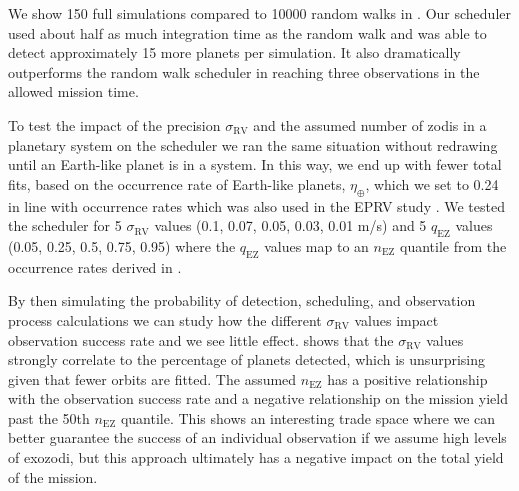 We show 150 full simulations compared to 10000 random walks in 
. Our scheduler used about half as much integration
time as the random walk and was able to detect approximately 15 more planets
per simulation. It also dramatically outperforms the random walk scheduler
in reaching three observations in the allowed mission time.

To test the impact of the precision $\sigma_\textrm{RV}$ and the assumed number of zodis in
a planetary system on the scheduler we ran the same situation without redrawing
until an Earth-like planet is in a system. In this way, we end up with fewer
total fits, based on the occurrence rate of Earth-like planets,
$\eta_{\oplus}$, which we set to 0.24 in line with
\citet{dulzJointRadialVelocity2020} occurrence rates which was also used in the
EPRV study \citep{morganExplorationExpectedNumber2022a}. We tested the
scheduler for 5 $\sigma_\textrm{RV}$ values (0.1, 0.07, 0.05, 0.03, 0.01 m/s) and 5
$q_\textrm{EZ}$ values (0.05, 0.25, 0.5, 0.75, 0.95) where the $q_\textrm{EZ}$
values map to an $n_\textrm{EZ}$ quantile from the occurrence rates derived
in \citet{ertelHOSTSSurvey2020}.

By then simulating the probability of detection, scheduling, and observation
process calculations we can study how the different $\sigma_\textrm{RV}$ values
impact observation success rate and we see little effect.
 shows that the $\sigma_\textrm{RV}$ values
strongly correlate to the percentage of planets detected, which is unsurprising
given that fewer orbits are fitted.
The assumed $n_\textrm{EZ}$ has a positive relationship with the observation
success rate and a negative relationship on the mission yield past the 50th
$n_\textrm{EZ}$ quantile. This shows an interesting trade space where we can
better guarantee the success of an individual observation if we assume high
levels of exozodi, but this approach ultimately has a negative impact on the
total yield of the mission.

